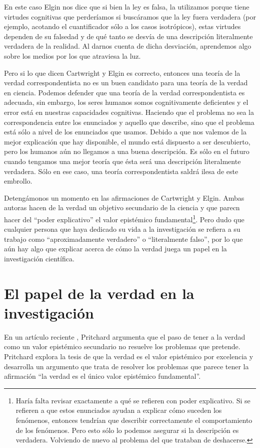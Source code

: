 En este caso Elgin nos dice que si bien la ley es falsa, la utilizamos porque tiene virtudes cognitivas que perderíamos si buscáramos que la ley fuera verdadera (por ejemplo, acotando el cuantificador sólo a los casos isotrópicos), estas virtudes dependen de su falsedad y de qué tanto se desvía de una descripción literalmente verdadera de la realidad. Al darnos cuenta de dicha desviación, aprendemos algo sobre los medios por los que atraviesa la luz.

Pero si lo que dicen Cartwright y Elgin es correcto, entonces una teoría de la verdad correspondentista no es un buen candidato para una teoría de la verdad en ciencia. Podemos defender que una teoría de la verdad correspondentista es adecuada, sin embargo, los seres humanos somos cognitivamente deficientes y el error está en nuestras capacidades cognitivas. Haciendo que el problema no sea la correspondencia entre los enunciados y aquello que describe, sino que el problema está sólo a nivel de los enunciados que usamos. Debido a que nos valemos de la mejor explicación que hay disponible, el mundo está dispuesto a ser descubierto, pero los humanos aún no llegamos a una buena descripción. Es sólo en el futuro cuando tengamos una mejor teoría que ésta será una descripción literalmente verdadera. Sólo en ese caso, una teoría correspondentista saldrá ilesa de este embrollo.

Detengámonos un momento en las afirmaciones de Cartwright y Elgin. Ambas autoras hacen de la verdad un objetivo secundario de la ciencia y que parecn hacer del ``poder explicativo'' el valor epistémico fundamental\footnote{Haría falta revisar exactamente a qué se refieren con poder explicativo. Si se refieren a que estos enunciados ayudan a explicar cómo suceden los fenómenos, entonces tendrían que describir correctamente el comportamiento de los fenómenos. Pero esto sólo lo podemos asegurar si la descripción es verdadera. Volviendo de nuevo al problema del que trataban de deshacerse.}. Pero dudo que cualquier persona que haya dedicado su vida a la investigación se refiera a su trabajo como ``aproximadamente verdadero'' o ``literalmente falso'', por lo que aún hay algo que explicar acerca de cómo la verdad juega un papel en la investigación científica.

\section{El papel de la verdad en la investigación}

\noindent En un artículo reciente \cite{Pritchard2019}, Pritchard argumenta que el paso de tener a la verdad como un valor epistémico secundario no resuelve los problemas que pretende. Pritchard explora la tesis de que la verdad es el valor epistémico por excelencia y desarrolla un argumento que trata de resolver los problemas que parece tener la afirmación ``la verdad es el único valor epistémico fundamental''.

